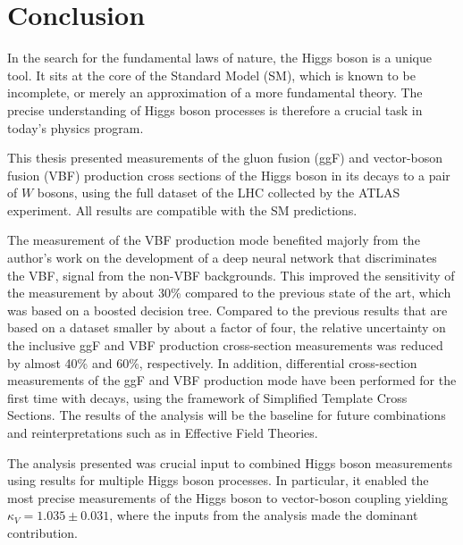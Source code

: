 \chapter{Conclusion}
\label{chap:conclusion}
In the search for the fundamental laws of nature, the Higgs boson is a unique tool. 
It sits at the core of the Standard Model (SM), which is known to be incomplete, or merely an approximation of a more fundamental theory. 
The precise understanding of Higgs boson processes is therefore a crucial task in today's physics program. 

This thesis presented measurements of the gluon fusion (ggF) and vector-boson fusion (VBF) production cross sections of the Higgs boson in its decays to a pair of $W$ bosons, using the full \RunTwo dataset of the LHC collected by the ATLAS experiment. 
All results are compatible with the SM predictions. 

The measurement of the VBF production mode benefited majorly from the author's work on the development of a deep neural network that discriminates the VBF, \HWW signal from the non-VBF backgrounds. 
This improved the sensitivity of the measurement by about 30\% compared to the previous state of the art, which was based on a boosted decision tree. 
Compared to the previous \RunTwo results that are based on a dataset smaller by about a factor of four, the relative uncertainty on the inclusive ggF and VBF production cross-section measurements was reduced by almost 40\% and 60\%, respectively. 
In addition, differential cross-section measurements of the ggF and VBF production mode have been performed for the first time with \HWW decays, using the framework of Simplified Template Cross Sections. 
The results of the \HWW analysis will be the baseline for future combinations and reinterpretations such as in Effective Field Theories. 

The analysis presented was crucial input to combined Higgs boson measurements using results for multiple Higgs boson processes. 
In particular, it enabled the most precise measurements of the Higgs boson to vector-boson coupling yielding $\kappa_V = 1.035 \pm 0.031$, where the inputs from the \HWWdet analysis made the dominant contribution. 


